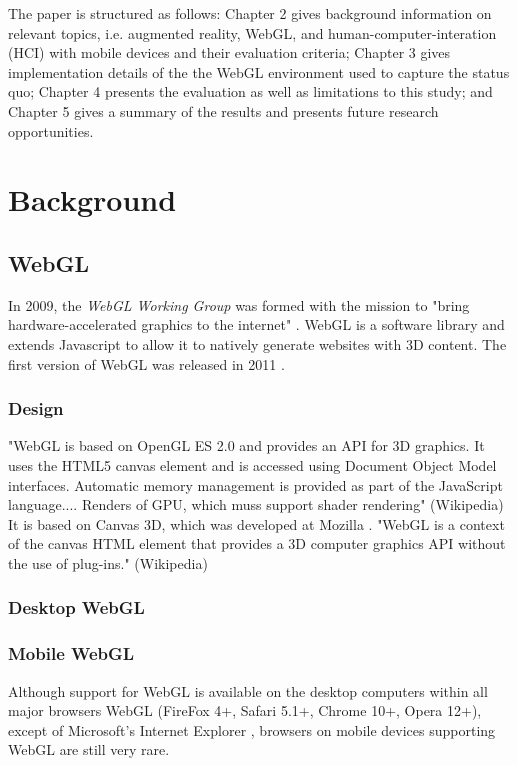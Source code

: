 \documentclass[12pt,journal,compsoc]{IEEEtran}
\begin{document}
The paper is structured as follows: Chapter 2 gives background information on relevant topics, i.e. augmented reality, WebGL, and human-computer-interation (HCI) with mobile devices and their evaluation criteria; Chapter 3 gives implementation details of the the WebGL environment used to capture the status quo; Chapter 4 presents the evaluation as well as limitations to this study; and Chapter 5 gives a summary of the results and presents future research opportunities.

\section{Background}

\subsection{WebGL}
In 2009, the \textit{WebGL Working Group} was formed with the mission to "bring hardware-accelerated graphics to the internet" \cite{Khronos2009}.  WebGL is a software library and extends Javascript to allow it to natively generate websites with 3D content. The first version of WebGL was released in 2011 \cite{Khronos2011}.

\subsubsection{Design}
"WebGL is based on OpenGL ES 2.0 and provides an API for 3D graphics. It uses the HTML5 canvas element and is accessed using Document Object Model interfaces. Automatic memory management is provided as part of the JavaScript language.... Renders of GPU, which muss support shader rendering" (Wikipedia)
It is based on Canvas 3D, which was developed at Mozilla \cite{Mozilla2007}.
"WebGL is a context of the canvas HTML element that provides a 3D computer graphics API without the use of plug-ins." (Wikipedia)

\subsubsection{Desktop WebGL}

\subsubsection{Mobile WebGL}
Although support for WebGL is available on the desktop computers within all major browsers WebGL (FireFox 4+, Safari 5.1+, Chrome 10+, Opera 12+), except of Microsoft's Internet Explorer \cite{Golubovic2011}, browsers on mobile devices supporting WebGL are still very rare.
\end{document}
